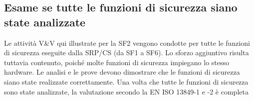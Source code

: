 \subsection{Esame se tutte le funzioni di sicurezza siano state analizzate}
\label{sec:07-8-3}
Le attività V\&V qui illustrate per la SF2 vengono condotte per tutte le funzioni di sicurezza eseguite dalla SRP/CS (da SF1 a SF6). Lo sforzo aggiuntivo risulta tuttavia contenuto, poiché molte funzioni di sicurezza impiegano lo stesso hardware. Le analisi e le prove devono dimostrare che le funzioni di sicurezza siano state realizzate correttamente. Una volta che tutte le funzioni di sicurezza sono state analizzate, la valutazione secondo la EN ISO 13849-1 e -2 è completa
